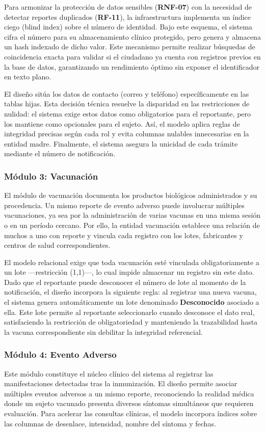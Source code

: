 Para armonizar la protección de datos sensibles (\textbf{RNF-07}) con la necesidad de detectar reportes duplicados (\textbf{RF-11}), la infraestructura implementa un índice ciego (blind index) sobre el número de identidad. 
Bajo este esquema, el sistema cifra el número para su almacenamiento clínico protegido, pero genera y almacena un hash indexado de dicho valor. 
Este mecanismo permite realizar búsquedas de coincidencia exacta para validar si el ciudadano ya cuenta con registros previos en la base de datos, garantizando un rendimiento óptimo sin exponer el identificador en texto plano.

El diseño sitúa los datos de contacto (correo y teléfono) específicamente en las tablas hijas. 
Esta decisión técnica resuelve la disparidad en las restricciones de nulidad: el sistema exige estos datos como obligatorios para el reportante, pero los mantiene como opcionales para el sujeto. 
Así, el modelo aplica reglas de integridad precisas según cada rol y evita columnas nulables innecesarias en la entidad madre.
Finalmente, el sistema asegura la unicidad de cada trámite mediante el número de notificación.


\subsubsection{Módulo 3: Vacunación}
El módulo de vacunación documenta los productos biológicos administrados y su procedencia. Un mismo reporte de evento adverso puede involucrar múltiples vacunaciones, ya sea por la administración de varias vacunas en una misma sesión o en un período cercano. Por ello, la entidad vacunación establece una relación de muchos a uno con reporte y vincula cada registro con los lotes, fabricantes y centros de salud correspondientes.

El modelo relacional exige que toda vacunación esté vinculada obligatoriamente a un lote —restricción (1,1)—, lo cual impide almacenar un registro sin este dato. 
Dado que el reportante puede desconocer el número de lote al momento de la notificación, el diseño incorpora la siguiente regla: al registrar una nueva vacuna, el sistema genera automáticamente un lote denominado \textbf{Desconocido} asociado a ella. 
Este lote permite al reportante seleccionarlo cuando desconoce el dato real, satisfaciendo la restricción de obligatoriedad y manteniendo la trazabilidad hasta la vacuna correspondiente sin debilitar la integridad referencial.


\subsubsection{Módulo 4: Evento Adverso}
Este módulo constituye el núcleo clínico del sistema al registrar las manifestaciones detectadas tras la inmunización. 
El diseño permite asociar múltiples eventos adversos a un mismo reporte, reconociendo la realidad médica donde un sujeto vacunado presenta diversos síntomas simultáneos que requieren evaluación. 
Para acelerar las consultas clínicas, el modelo incorpora índices sobre las columnas de desenlace, intensidad, nombre del síntoma y fechas.

